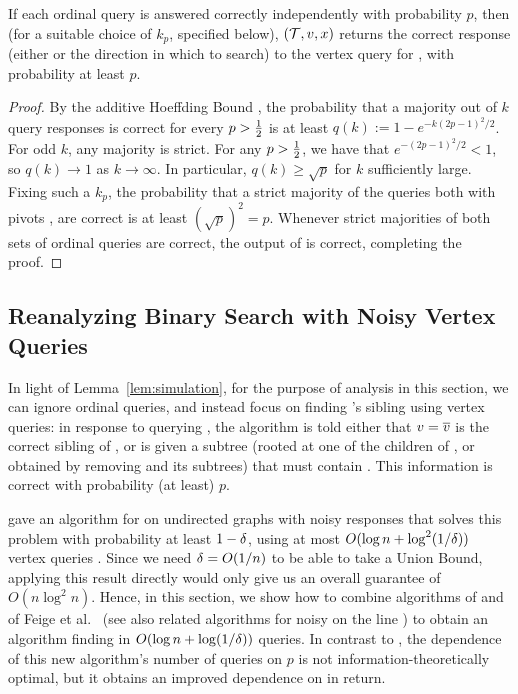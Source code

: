 \begin{lemma} \label{lem:simulation}
If each ordinal query is answered correctly independently
with probability $p$, then (for a suitable choice of $k_p$, specified below),
\SimulateVertexQuery $(\Tree, \Vertex, \ElS)$ returns the correct
response (either \Vertex or the direction in which to search)
to the vertex query for \Vertex, with probability at least $p$.
\end{lemma}

\begin{proof}
By the additive Hoeffding Bound \cite{hoeffding:1963:probability},
the probability that a majority out of $k$ query responses is correct
for every $p > \Half$
is at least $q(k) := 1- e^{-k(2p - 1)^2/2}$.
For odd $k$, any majority is strict.
For any $p > \Half$, we have that $e^{-(2p - 1)^2/2} < 1$,
so $q(k) \to 1$ as $k \to \infty$.
In particular, $q(k) \geq \sqrt{p}$ for $k$ sufficiently large.
Fixing such a $k_p$, the probability that a strict majority
of the queries both with pivots \Vertex, \VertexP are correct
is at least $(\sqrt{p})^2 = p$.
Whenever strict majorities of both sets of ordinal queries are correct,
the output of \SimulateVertexQuery is correct, completing the proof. 
\end{proof}

\subsection{Reanalyzing Binary Search with Noisy Vertex Queries}

In light of Lemma~\ref{lem:simulation},
for the purpose of analysis in this section,
we can ignore ordinal queries,
and instead focus on finding \ElS's sibling \VertexBar using vertex queries:
in response to querying \Vertex, the algorithm is told either that
$\Vertex = \VertexBar$ is the correct sibling of \ElS,
or is given a subtree
(rooted at one of the children of \Vertex,
or obtained by removing \Vertex and its subtrees)
that must contain \ElS.
This information is correct with probability (at least) $p$.

\cite{2016:binary-search} gave an algorithm for \binarysearch on
undirected graphs with noisy responses that solves this problem with
probability at least $1 - \delta$, using at most $O(\log n + \log^2 (1/\delta))$
vertex queries \cite[Theorem 8]{2016:binary-search}.
Since we need $\delta = O(1/n)$ to be able to take a Union Bound,
applying this result directly would only give us an overall guarantee of
$O(n \log^2 n)$.
Hence, in this section, we show how to combine algorithms of 
\cite[Algorithm 2]{2016:binary-search} and of
Feige et al.~\cite{feige-raghavan-peleg-upfal:1994:noisy}
(see also related algorithms for noisy \binarysearch on the line
\cite{BenOr-hassidim:2008:noisy-binary-search,%
karp-kleinberg:2007:noisy}) 
to obtain an algorithm finding \VertexBar in $O(\log n + \log (1/\delta))$ queries.
In contrast to \cite{2016:binary-search},
the dependence of this new algorithm's number of queries on $p$ is not
information-theoretically optimal, but it obtains an improved
dependence on \Err in return.

